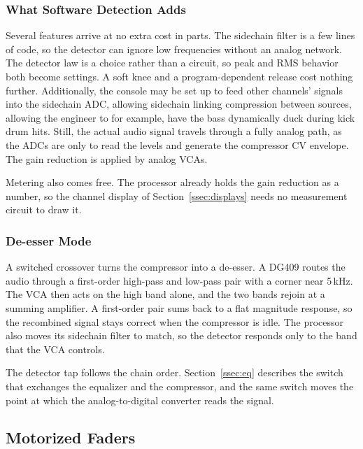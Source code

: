 \documentclass[11pt, letterpaper,titlepage]{article}
\begin{document}
\subsubsection*{What Software Detection Adds}
\label{sssec:comp-software}

Several features arrive at no extra cost in parts. The sidechain filter is a few
lines of code, so the detector can ignore low frequencies without an analog
network. The detector law is a choice rather than a circuit, so peak and RMS
behavior both become settings. A soft knee and a program-dependent release cost
nothing further. Additionally, the console may be set up to feed other channels' signals into the sidechain ADC, allowing sidechain linking compression between sources, allowing the engineer to for example, have the bass dynamically duck during kick drum hits. Still, the actual audio signal travels through a fully analog path, as the ADCs are only to read the levels and generate the compressor CV envelope. The gain reduction is applied by analog VCAs.

Metering also comes free. The processor already holds the gain reduction as a
number, so the channel display of Section~\ref{ssec:displays} needs no
measurement circuit to draw it.

\subsubsection*{De-esser Mode}
\label{sssec:comp-deess}

A switched crossover turns the compressor into a de-esser. A DG409 routes the
audio through a first-order high-pass and low-pass pair with a corner near
5\,kHz. The VCA then acts on the high band alone, and the two bands rejoin at a
summing amplifier. A first-order pair sums back to a flat magnitude response, so
the recombined signal stays correct when the compressor is idle. The processor
also moves its sidechain filter to match, so the detector responds only to the
band that the VCA controls.

The detector tap follows the chain order. Section~\ref{ssec:eq} describes the
switch that exchanges the equalizer and the compressor, and the same switch
moves the point at which the analog-to-digital converter reads the signal.



\subsection{Motorized Faders}
\label{ssec:faders}
\end{document}
